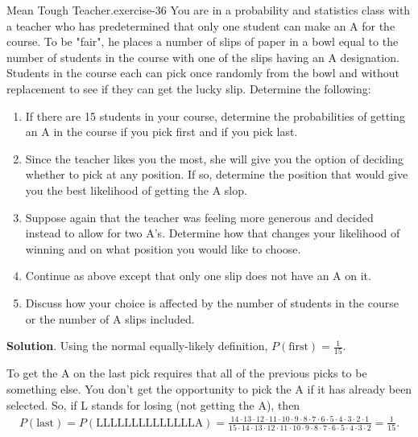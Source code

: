 \documentclass[10pt,]{book}
\numberwithin{equation}{section}
\begin{document}
\begin{inlineexercise}{Mean Tough Teacher.}{exercise-36}%
\hypertarget{p-611}{}%
You are in a probability and statistics class with a teacher who has predetermined that only one student can make an A for the course. To be "fair", he places a number of slips of paper in a bowl equal to the number of students in the course with one of the slips having an A designation. Students in the course each can pick once randomly from the bowl and without replacement to see if they can get the lucky slip.  Determine the following: \leavevmode%
\begin{enumerate}
\item\hypertarget{li-163}{}If there are 15 students in your course, determine the probabilities of getting an A in the course if you pick first and if you pick last.%
\item\hypertarget{li-164}{}Since the teacher likes you the most, she will give you the option of deciding whether to pick at any position. If so, determine the position that would give you the best likelihood of getting the A slop.%
\item\hypertarget{li-165}{}Suppose again that the teacher was feeling more generous and decided instead to allow for two A's. Determine how that changes your likelihood of winning and on what position you would like to choose.%
\item\hypertarget{li-166}{}Continue as above except that only one slip does not have an A on it.%
\item\hypertarget{li-167}{}Discuss how your choice is affected by the number of students in the course or the number of A slips included.%
\end{enumerate}
%
\par\smallskip%
\noindent\textbf{Solution}.\hypertarget{solution-14}{}\quad%
\hypertarget{p-612}{}%
Using the normal equally-likely definition, \(P(\text{first}) = \frac{1}{15}\).%
\par
\hypertarget{p-613}{}%
To get the A on the last pick requires that all of the previous picks to be something else. You don't get the opportunity to pick the A if it has already been selected. So, if L stands for losing (not getting the A), then%
\begin{gather*}
P(\text{last}) = P(\text{LLLLLLLLLLLLLLA}) = \frac{14 \cdot 13 \cdot 12 \cdot 11 \cdot 10 \cdot 9  \cdot 8  \cdot 7  \cdot 6  \cdot 5  \cdot 4  \cdot 3 \cdot 2  \cdot 1}{15 \cdot 14 \cdot 13 \cdot 12 \cdot 11 \cdot 10 \cdot 9 \cdot 8 \cdot 7 \cdot 6 \cdot 5 \cdot 4 \cdot 3 \cdot 2} = \frac{1}{15}.

\end{gather*}
\end{inlineexercise}
\end{document}
